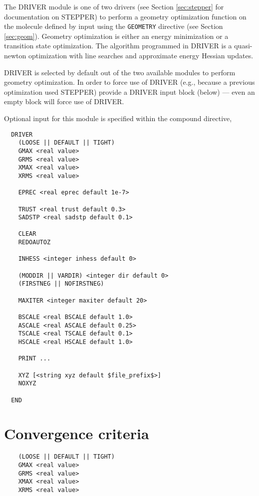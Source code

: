 %
%
\label{sec:driver}

The DRIVER module is one of two drivers (see Section \ref{sec:stepper}
for documentation on STEPPER) to perform a geometry optimization
function on the molecule defined by input using the \verb+GEOMETRY+
directive (see Section \ref{sec:geom}).  Geometry optimization is
either an energy minimization or a transition state optimization.
The algorithm programmed in DRIVER is a quasi-newton optimization
with line searches and approximate energy Hessian updates.

DRIVER is selected by default out of the two available modules to
perform geometry optimization.  In order to force use of DRIVER (e.g.,
because a previous optimization used STEPPER) provide a DRIVER input
block (below) --- even an empty block will force use of DRIVER.

Optional input for this module is specified within the compound
directive,
\begin{verbatim}
  DRIVER 
    (LOOSE || DEFAULT || TIGHT)
    GMAX <real value>
    GRMS <real value>
    XMAX <real value>
    XRMS <real value>

    EPREC <real eprec default 1e-7>

    TRUST <real trust default 0.3>
    SADSTP <real sadstp default 0.1>

    CLEAR
    REDOAUTOZ

    INHESS <integer inhess default 0>

    (MODDIR || VARDIR) <integer dir default 0>
    (FIRSTNEG || NOFIRSTNEG)

    MAXITER <integer maxiter default 20>

    BSCALE <real BSCALE default 1.0>
    ASCALE <real ASCALE default 0.25>
    TSCALE <real TSCALE default 0.1>
    HSCALE <real HSCALE default 1.0>
   
    PRINT ...

    XYZ [<string xyz default $file_prefix$>]
    NOXYZ

  END
\end{verbatim}

\sloppy

\section{Convergence criteria}

\begin{verbatim}
    (LOOSE || DEFAULT || TIGHT)
    GMAX <real value>
    GRMS <real value>
    XMAX <real value>
    XRMS <real value>
\end{verbatim}


